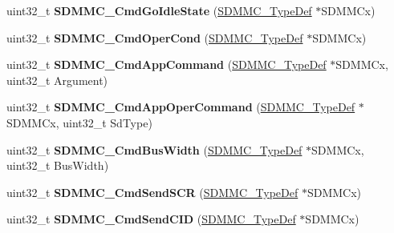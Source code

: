 \begin{DoxyCompactItemize}
uint32\+\_\+t {\bfseries S\+D\+M\+M\+C\+\_\+\+Cmd\+Go\+Idle\+State} (\mbox{\hyperlink{struct_s_d_m_m_c___type_def}{S\+D\+M\+M\+C\+\_\+\+Type\+Def}} $\ast$S\+D\+M\+M\+Cx)
\item 
\mbox{\label{group___h_a_l___s_d_m_m_c___l_l___group3_ga67afce4ee22eb315b05eaf1e79e1a2d7}} 
uint32\+\_\+t {\bfseries S\+D\+M\+M\+C\+\_\+\+Cmd\+Oper\+Cond} (\mbox{\hyperlink{struct_s_d_m_m_c___type_def}{S\+D\+M\+M\+C\+\_\+\+Type\+Def}} $\ast$S\+D\+M\+M\+Cx)
\item 
\mbox{\label{group___h_a_l___s_d_m_m_c___l_l___group3_gab40b85dadfc0e77bdc6fc53839ef7eae}} 
uint32\+\_\+t {\bfseries S\+D\+M\+M\+C\+\_\+\+Cmd\+App\+Command} (\mbox{\hyperlink{struct_s_d_m_m_c___type_def}{S\+D\+M\+M\+C\+\_\+\+Type\+Def}} $\ast$S\+D\+M\+M\+Cx, uint32\+\_\+t Argument)
\item 
\mbox{\label{group___h_a_l___s_d_m_m_c___l_l___group3_ga8aaef48c98c4ff7be31cf66e55aa65d8}} 
uint32\+\_\+t {\bfseries S\+D\+M\+M\+C\+\_\+\+Cmd\+App\+Oper\+Command} (\mbox{\hyperlink{struct_s_d_m_m_c___type_def}{S\+D\+M\+M\+C\+\_\+\+Type\+Def}} $\ast$S\+D\+M\+M\+Cx, uint32\+\_\+t Sd\+Type)
\item 
\mbox{\label{group___h_a_l___s_d_m_m_c___l_l___group3_gaa089c90cc5330c0771344e0d75740fc0}} 
uint32\+\_\+t {\bfseries S\+D\+M\+M\+C\+\_\+\+Cmd\+Bus\+Width} (\mbox{\hyperlink{struct_s_d_m_m_c___type_def}{S\+D\+M\+M\+C\+\_\+\+Type\+Def}} $\ast$S\+D\+M\+M\+Cx, uint32\+\_\+t Bus\+Width)
\item 
\mbox{\label{group___h_a_l___s_d_m_m_c___l_l___group3_ga35292bc59a7eb032e66e2db454574b9e}} 
uint32\+\_\+t {\bfseries S\+D\+M\+M\+C\+\_\+\+Cmd\+Send\+S\+CR} (\mbox{\hyperlink{struct_s_d_m_m_c___type_def}{S\+D\+M\+M\+C\+\_\+\+Type\+Def}} $\ast$S\+D\+M\+M\+Cx)
\item 
\mbox{\label{group___h_a_l___s_d_m_m_c___l_l___group3_gada01b1501c141777495014f6134b6726}} 
uint32\+\_\+t {\bfseries S\+D\+M\+M\+C\+\_\+\+Cmd\+Send\+C\+ID} (\mbox{\hyperlink{struct_s_d_m_m_c___type_def}{S\+D\+M\+M\+C\+\_\+\+Type\+Def}} $\ast$S\+D\+M\+M\+Cx)

\end{DoxyCompactItemize}
